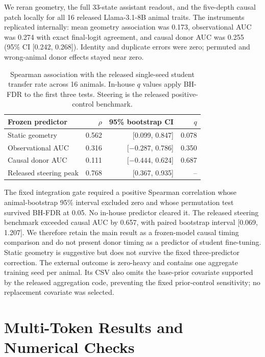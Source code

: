 \documentclass[letterpaper]{article}
\newcommand{\CI}[2]{95\% CI [#1, #2]}
\begin{document}
We reran geometry, the full 33-state assistant readout, and the five-depth causal
patch locally for all 16 released Llama-3.1-8B animal traits. The instruments
replicated internally: mean geometry association was 0.173, observational AUC
was 0.274 with exact final-logit agreement, and causal donor AUC was 0.255
(\CI{0.242}{0.268}). Identity and duplicate errors were zero; permuted and
wrong-animal donor effects stayed near zero.

\begin{table}[t]
\centering
\small
\caption{Spearman association with the released single-seed student transfer
rate across 16 animals. In-house $q$ values apply BH-FDR to the first three
tests. Steering is the released positive-control benchmark.}
\label{tab:external-transfer}
\begin{tabular}{lrrr}
\toprule
Frozen predictor & $\rho$ & 95\% bootstrap CI & $q$ \\
\midrule
Static geometry & 0.562 & [0.099, 0.847] & 0.078 \\
Observational AUC & 0.316 & [$-0.287$, 0.786] & 0.350 \\
Causal donor AUC & 0.111 & [$-0.444$, 0.624] & 0.687 \\
Released steering peak & 0.768 & [0.367, 0.935] & -- \\
\bottomrule
\end{tabular}
\end{table}

The fixed integration gate required a positive Spearman correlation whose
animal-bootstrap 95\% interval excluded zero and whose permutation test survived
BH-FDR at 0.05. No in-house predictor cleared it. The released steering
benchmark exceeded causal AUC by 0.657, with paired bootstrap interval
[0.069, 1.207]. We therefore retain the main result as a frozen-model causal
timing comparison and do not present donor timing as a predictor of student
fine-tuning. Static geometry is suggestive but does not survive the fixed
three-predictor correction. The external outcome is zero-heavy and contains one
aggregate training seed per animal. Its CSV also omits the base-prior covariate
supported by the released aggregation code, preventing the fixed prior-control
sensitivity; no replacement covariate was selected.

\section{Multi-Token Results and Numerical Checks}
\end{document}

